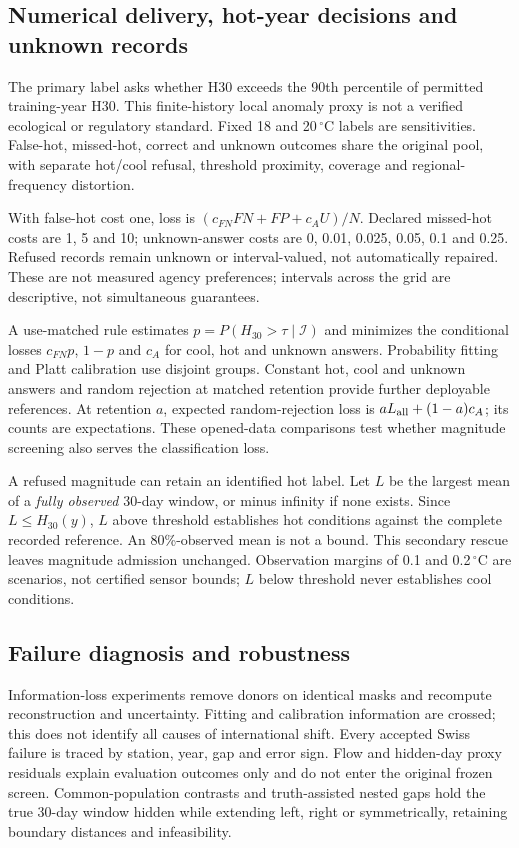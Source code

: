 \subsection{Numerical delivery, hot-year decisions and unknown records}

The primary label asks whether H30 exceeds the 90th percentile of permitted training-year H30. This finite-history local anomaly proxy is not a verified ecological or regulatory standard. Fixed 18 and 20\,$^{\circ}$C labels are sensitivities. False-hot, missed-hot, correct and unknown outcomes share the original pool, with separate hot/cool refusal, threshold proximity, coverage and regional-frequency distortion.

With false-hot cost one, loss is $(c_{FN}FN+FP+c_AU)/N$. Declared missed-hot costs are 1, 5 and 10; unknown-answer costs are 0, 0.01, 0.025, 0.05, 0.1 and 0.25. Refused records remain unknown or interval-valued, not automatically repaired. These are not measured agency preferences; intervals across the grid are descriptive, not simultaneous guarantees.

A use-matched rule estimates $p=P(H_{30}>\tau\mid\mathcal I)$ and minimizes the conditional losses $c_{FN}p$, $1-p$ and $c_A$ for cool, hot and unknown answers. Probability fitting and Platt calibration use disjoint groups. Constant hot, cool and unknown answers and random rejection at matched retention provide further deployable references. At retention $a$, expected random-rejection loss is $aL_{\rm all}+(1-a)c_A$; its counts are expectations. These opened-data comparisons test whether magnitude screening also serves the classification loss.

A refused magnitude can retain an identified hot label. Let $L$ be the largest mean of a \emph{fully observed} 30-day window, or minus infinity if none exists. Since $L\leq H_{30}(y)$, $L$ above threshold establishes hot conditions against the complete recorded reference. An 80\%-observed mean is not a bound. This secondary rescue leaves magnitude admission unchanged. Observation margins of 0.1 and 0.2\,$^{\circ}$C are scenarios, not certified sensor bounds; $L$ below threshold never establishes cool conditions.

\subsection{Failure diagnosis and robustness}

Information-loss experiments remove donors on identical masks and recompute reconstruction and uncertainty. Fitting and calibration information are crossed; this does not identify all causes of international shift. Every accepted Swiss failure is traced by station, year, gap and error sign. Flow and hidden-day proxy residuals explain evaluation outcomes only and do not enter the original frozen screen. Common-population contrasts and truth-assisted nested gaps hold the true 30-day window hidden while extending left, right or symmetrically, retaining boundary distances and infeasibility.

